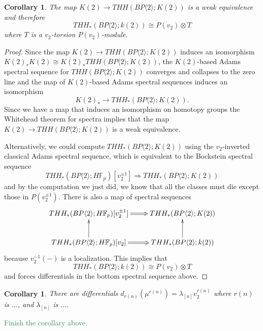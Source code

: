 \documentclass[12pt]{amsart}
\newcommand{\bra}[1]{\langle #1 \rangle}
\newcommand{\tBP}[1]{BP\bra{#1}}
\newtheorem{cor}[equation]{Corollary}
\theoremstyle{definition}
\numberwithin{equation}{section}
\numberwithin{figure}{section}
\begin{document}
\begin{cor}
The map $K(2)\rightarrow THH(\tBP{2};K(2))$ is a weak equivalence and therefore 
\[ THH_*(\tBP{2};k(2))\cong P(v_2)\otimes T \] 
where $T$ is a $v_2$-torsion $P(v_2)$-module. 
\end{cor}
\begin{proof}
Since the map $K(2)\rightarrow THH(\tBP{2};K(2))$ induces an isomorphism $K(2)_*K(2)\cong K(2)_*THH(\tBP{2};K(2))$, the $K(2)$-based Adams spectral sequence for $THH(\tBP{2};K(2))$ converges and collapses to the zero line and the map of $K(2)$-based Adams spectral sequences induces an isomorphism
\[ K(2)_*\rightarrow THH_*(\tBP{2};K(2)).\] 
Since we have a map that induces an isomorphism on homotopy groups the Whitehead theorem for spectra implies that the map $K(2)\rightarrow THH(\tBP{2};K(2))$ is a weak equivalence. 

Alternatively, we could compute $THH_*(\tBP{2};K(2))$ using the $v_2$-inverted classical Adams spectral sequence, which is equivalent to the Bockstein spectral sequence 
\[ THH_*(\tBP{2};H\mathbb{F}_p)[v_2^{\pm 1}]\Rightarrow THH_*(\tBP{2};K(2))\]
and by the computation we just did, we know that all the classes must die except those in $P(v_2^{\pm 1})$. There is also a map of spectral sequences 
\[ 
\xymatrix{
THH_*(\tBP{2};H\mathbb{F}_p)[v_2^{\pm 1}] \ar@{=>}[r] & THH_*(\tBP{2};K(2)) \\
THH_*(\tBP{2};H\mathbb{F}_p)[v_2]  \ar[u] \ar@{=>}[r] &THH_*(\tBP{2};k(2)) \ar[u] 
}
\] 
because $v_2^{-1}(-)$ is a localization. This implies that 
\[ THH_*(\tBP{2};k(2))\cong P(v_2)\otimes T \] 
and forces differentials in the bottom spectral sequence above.
\end{proof}
\begin{cor}
There are differentials $d_{r(n)}(\mu^{r(n)})=\lambda_{[n]}v_2^{r(n)}$
where $r(n)$ is $\dots$, and $\lambda_{[n]}$ is $\dots$.
\end{cor}
\textcolor{seagreen}{Finish the corollary above.}




\end{document}
